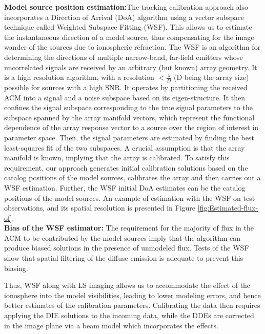 \documentclass{aa}
\begin{document}
\textbf{Model source position estimation:}The tracking calibration approach also
incorporates  a Direction  of Arrival  (DoA) algorithm  using a  vector subspace
technique           called          Weighted           Subspace          Fitting
(WSF)\citep{viberg1991detection}. This  allows us to  estimate the instantaneous
direction  of a  model source,  thus compensating  for the  image wander  of the
sources due to  ionospheric refraction. The WSF is  an algorithm for determining
the directions  of multiple  narrow-band, far-field emitters  whose uncorrelated
signals are  received by an arbitrary (but  known) array geometry. It  is a high
resolution algorithm, with a  resolution $<\frac{\lambda}{D}$ (D being the array
size) possible  for sources  with a  high SNR. It  operates by  partitioning the
received ACM  into a signal and  a noise subspace based  on its eigen-structure.
It then confines the signal subspace corresponding to the true signal parameters
to  the subspace  spanned by  the array  manifold vectors,  which  represent the
functional dependence of  the array response vector to a  source over the region
of interest  in parameter  space. Then, the  signal parameters are  estimated by
finding the best least-squares fit of the two subspaces. A crucial assumption is
that the  array manifold  is known,  implying that the  array is  calibrated. To
satisfy this  requirement, our approach generates  initial calibration solutions
based on  the catalog positions of  the model sources, calibrates  the array and
then carries out a WSF estimation. Further, the WSF initial DoA estimates can be
the catalog  positions of the model  sources. An example of  estimation with the
WSF  on test observations,  and its  spatial resolution  is presented  in Figure
\ref{fig:Estimated-flux-of}.\\   \textbf{Bias  of   the   WSF  estimator:}   The
requirement for the majority  of flux in the ACM to be  contributed by the model
sources imply that the algorithm can produce biased solutions in the presence of
unmodeled flux.  Tests of  the WSF  show that spatial  filtering of  the diffuse
emission is adequate to prevent this biasing.

Thus,  WSF along with  LS imaging  allows us  to accommodate  the effect  of the
ionosphere into  the model visibilities,  leading to lower modeling  errors, and
hence better estimates of the calibration parameters.  Calibrating the data then
requires applying  the DIE solutions  to the incoming  data, while the  DDEs are
corrected in the image plane via a beam model which incorporates the effects.
\end{document}
